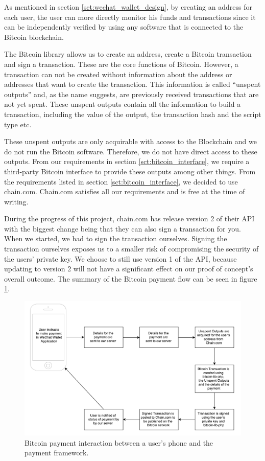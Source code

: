 As mentioned in section \ref{sct:wechat_wallet_design}, by creating an address for each user, the user can more directly monitor his funds and transactions since it can be independently verified by using any software that is connected to the Bitcoin blockchain.

The Bitcoin library allows us to create an address, create a Bitcoin transaction and sign a transaction. These are the core functions of Bitcoin. However, a transaction can not be created without information about the address or addresses that want to create the transaction. This information is called ``unspent outputs'' and, as the name suggests, are previously received transactions that are not yet spent. These unspent outputs contain all the information to build a transaction, including the value of the output, the transaction hash and the script type etc.

These unspent outputs are only acquirable with access to the Blockchain and we do not run the Bitcoin software. Therefore, we do not have direct access to these outputs. From our requirements in section \ref{sct:bitcoin_interface}, we require a third-party Bitcoin interface to provide these outputs among other things. From the requirements listed in section \ref{sct:bitcoin_interface}, we decided to use chain.com. Chain.com satisfies all our requirements and is free at the time of writing. 

During the progress of this project, chain.com has release version 2 of their API with the biggest change being that they can also sign a transaction for you. When we started, we had to sign the transaction ourselves. Signing the transaction ourselves exposes us to a smaller risk of compromising the security of the users' private key. We choose to still use version 1 of the API, because updating to version 2 will not have a significant effect on our proof of concept's overall outcome. The summary of the Bitcoin payment flow can be seen in figure \ref{fig:bitcoin_payment_flow}.

\begin{figure}
  \centering
    \caption{Bitcoin payment interaction between a user's phone and the payment framework.} 
    \includegraphics[width=\textwidth]{figs/Bitcoin_payment_flow.pdf}
   
   \label{fig:bitcoin_payment_flow}
\end{figure}

